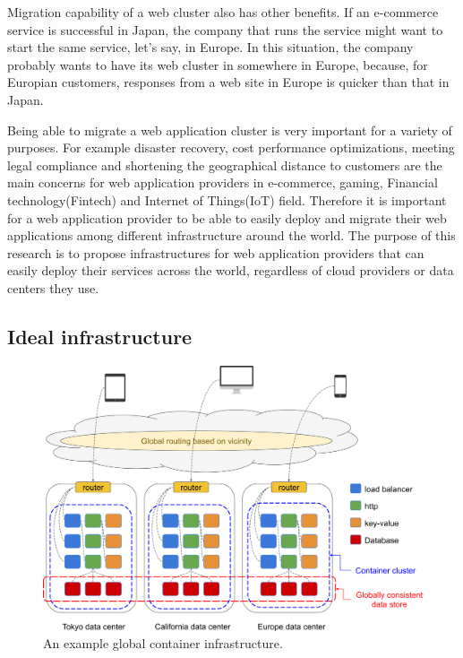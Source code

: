 Migration capability of a web cluster also has other benefits.
If an e-commerce service is successful in Japan, the company that runs the service might want to start the same service, let's say, in Europe.
In this situation, the company probably wants to have its web cluster in somewhere in Europe, because, for Europian customers, responses from a web site in Europe is quicker than that in Japan.

Being able to migrate a web application cluster is very important for a variety of purposes.
For example disaster recovery, cost performance optimizations, meeting legal compliance and shortening the geographical distance to customers are the main concerns for web application providers in e-commerce, gaming, Financial technology(Fintech) and Internet of Things(IoT) field.
Therefore it is important for a web application provider to be able to easily deploy and migrate their web applications among different infrastructure around the world.
The purpose of this research is to propose infrastructures for web application providers that can easily deploy their services across the world, regardless of cloud providers or data centers they use.

\subsection{Ideal infrastructure}

\begin{figure}[h]
\begin{center}
\includegraphics[width=0.9\columnwidth]{Figs/global_container_infrastructure}
\end{center}
\caption{
An example global container infrastructure.
}

\label{fig:global_container_infrastructure}
\end{figure}

